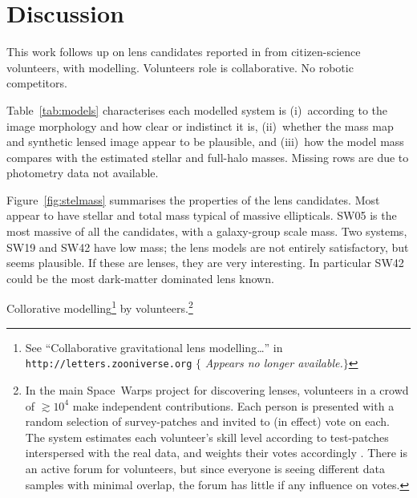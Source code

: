 \section{Discussion}\label{sec:summary}

This work follows up on lens candidates reported in
\cite{2016MNRAS.455.1191M} from citizen-science volunteers, with
modelling.  Volunteers role is collaborative.  No robotic competitors.

Table~\ref{tab:models} characterises each modelled system is
(i)~according to the image morphology and how clear or indistinct it
is, (ii)~whether the mass map and synthetic lensed image appear to be
plausible, and (iii)~how the model mass compares with the estimated
stellar and full-halo masses.  Missing rows are due to photometry data
not available.

Figure~\ref{fig:stelmass} summarises the properties of the lens
candidates.  Most appear to have stellar and total mass typical of
massive ellipticals.  SW05 is the most massive of all the candidates,
with a galaxy-group scale mass.  Two systems, SW19 and SW42 have low
mass; the lens models are not entirely satisfactory, but seems
plausible.  If these are lenses, they are very interesting.  In
particular SW42 could be the most dark-matter dominated lens known.

Collorative modelling\footnote{ See ``Collaborative gravitational lens
  modelling\dots'' in {\tt http://letters.zooniverse.org} $\{${\em
    Appears no longer available.}$\}$}
by volunteers.\footnote{In the
  main Space~Warps project for discovering lenses, volunteers in a
  crowd of $\gtrsim10^4$ make independent contributions.  Each person
  is presented with a random selection of survey-patches and invited
  to (in effect) vote on each.  The system estimates each volunteer's
  skill level according to test-patches interspersed with the real
  data, and weights their votes accordingly
  \citep{2016MNRAS.455.1171M}.  There is an active forum for
  volunteers, but since everyone is seeing different data samples with
  minimal overlap, the forum has little if any influence on votes.}

